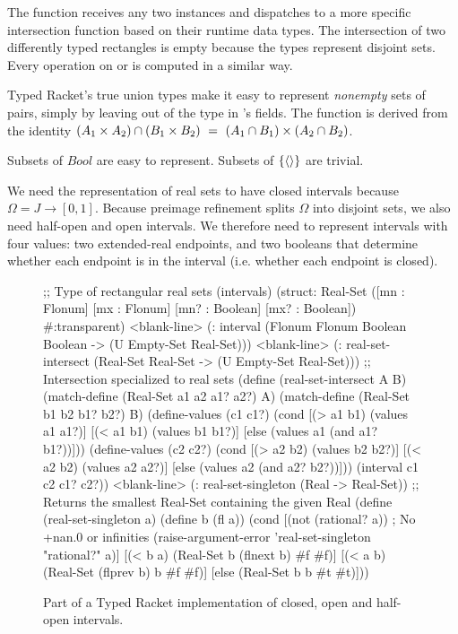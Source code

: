 The  function receives any two  instances and dispatches to a more specific intersection function based on their runtime data types.
The intersection of two differently typed rectangles is empty because the types represent disjoint sets.
Every operation on  or  is computed in a similar way.

Typed Racket's true union types make it easy to represent \emph{nonempty} sets of pairs, simply by leaving  out of the type in 's fields.
The  function is derived from the identity $(A_1 \times A_2) \cap (B_1 \times B_2)\ =\ (A_1 \cap B_1) \times (A_2 \cap B_2)$.

Subsets of $Bool$ are easy to represent.
Subsets of $\{{\langle{}\rangle}\}$ are trivial.

We need the representation of real sets to have closed intervals because $\Omega = J \to [0,1]$.
Because preimage refinement splits $\Omega$ into disjoint sets, we also need half-open and open intervals.
We therefore need to represent intervals with four values: two extended-real endpoints, and two booleans that determine whether each endpoint is in the interval (i.e. whether each endpoint is closed).

\begin{figure}[tb!]\centering
\begin{schemedisplay}
;; Type of rectangular real sets (intervals)
(struct: Real-Set ([mn : Flonum] [mx : Flonum] [mn? : Boolean] [mx? : Boolean])
  #:transparent)
<blank-line>
(: interval (Flonum Flonum Boolean Boolean -> (U Empty-Set Real-Set)))
<blank-line>
(: real-set-intersect (Real-Set Real-Set -> (U Empty-Set Real-Set)))
;; Intersection specialized to real sets
(define (real-set-intersect A B)
  (match-define (Real-Set a1 a2 a1? a2?) A)
  (match-define (Real-Set b1 b2 b1? b2?) B)
  (define-values (c1 c1?)
    (cond [(> a1 b1)  (values a1 a1?)]
          [(< a1 b1)  (values b1 b1?)]
          [else       (values a1 (and a1? b1?))]))
  (define-values (c2 c2?)
    (cond [(> a2 b2)  (values b2 b2?)]
          [(< a2 b2)  (values a2 a2?)]
          [else       (values a2 (and a2? b2?))]))
  (interval c1 c2 c1? c2?))
<blank-line>
(: real-set-singleton (Real -> Real-Set))
;; Returns the smallest Real-Set containing the given Real
(define (real-set-singleton a)
  (define b (fl a))
  (cond [(not (rational? a))  ; No +nan.0 or infinities
         (raise-argument-error 'real-set-singleton "rational?" a)]
        [(< b a)  (Real-Set b (flnext b) #f #f)]
        [(< a b)  (Real-Set (flprev b) b #f #f)]
        [else     (Real-Set b b #t #t)]))
\end{schemedisplay}
\bottomhrule
\caption[Typed Racket implementation of intervals]{Part of a Typed Racket implementation of closed, open and half-open intervals.}
\label{fig:typed-racket-real-set}
\end{figure}

